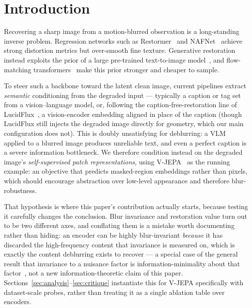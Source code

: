 \documentclass{article}
\begin{document}
\section{Introduction}
\label{sec:intro}

Recovering a sharp image from a motion-blurred observation is a long-standing inverse problem. Regression networks such as Restormer~\cite{zamir2022restormer} and NAFNet~\cite{chen2022nafnet} achieve strong distortion metrics but over-smooth fine texture. Generative restoration instead exploits the prior of a large pre-trained text-to-image model~\cite{wang2024exploiting,lin2023diffbir,wu2024osediff}, and flow-matching transformers~\cite{lipman2023flow,esser2024scaling,flux2024} make this prior stronger and cheaper to sample.

To steer such a backbone toward the latent clean image, current pipelines extract \emph{semantic} conditioning from the degraded input — typically a caption or tag set from a vision--language model, or, following the caption-free-restoration line of LucidFlux~\cite{lucidflux2025}, a vision-encoder embedding aligned in place of the caption (though LucidFlux still injects the degraded image directly for geometry, which our main configuration does not). This is doubly unsatisfying for deblurring: a VLM applied to a blurred image produces unreliable text, and even a perfect caption is a severe information bottleneck. We therefore condition instead on the degraded image's \emph{self-supervised patch representations}, using V-JEPA~\cite{assran2023self,bardes2025vjepa2} as the running example: an objective that predicts masked-region embeddings rather than pixels, which should encourage abstraction over low-level appearance and therefore blur-robustness.

That hypothesis is where this paper's contribution actually starts, because testing it carefully changes the conclusion. Blur invariance and restoration value turn out to be two different axes, and conflating them is a mistake worth documenting rather than hiding: an encoder can be highly blur-invariant \emph{because} it has discarded the high-frequency content that invariance is measured on, which is exactly the content deblurring exists to recover — a special case of the general result that invariance to a nuisance factor is information-minimality about that factor~\cite{achille2018invariance}, not a new information-theoretic claim of this paper. Sections~\ref{sec:analysis}--\ref{sec:critique} instantiate this for V-JEPA specifically with dataset-scale probes, rather than treating it as a single ablation table over encoders.
\end{document}

